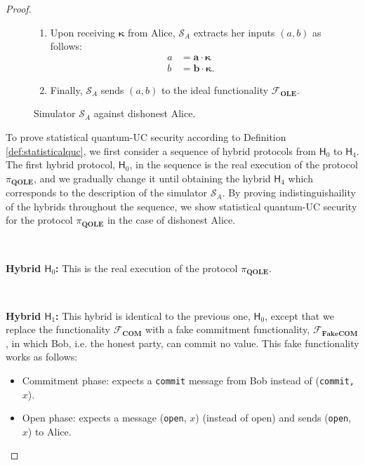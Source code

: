 \begin{proof}
\begin{figure}[h!]
\begin{tcolorbox}
\begin{enumerate}
 
        
        \item Upon receiving $\bm{\kappa}$ from Alice, $\mathcal{S}_A$ extracts her inputs $(a,b)$ as follows:
        \begin{equation}
            \begin{split}
            a &= \bm{a} \cdot \bm{\kappa} \\
            b &= \bm{b} \cdot \bm{\kappa}.
            \end{split}
        \label{eqn:extract_2}
        \end{equation}
        
        
        \item Finally, $\mathcal{S}_A$ sends $(a,b)$ to the ideal functionality $\mathcal{F}_{\textbf{OLE}}$.
        
    \end{enumerate} 
        
        \end{tcolorbox}
\caption{Simulator $\mathcal{S}_A$ against  dishonest Alice.}
\label{fig:simulator_dis_Alice}
\end{figure}
To prove statistical quantum-UC security according to Definition \ref{def:statisticalquc}, we first consider a sequence of hybrid protocols from $\mathsf{H}_0$ to $\mathsf{H}_4$. The first hybrid protocol, $\mathsf{H}_0$, in the sequence  is the real execution of the protocol $\mathcal{\pi}_{\textbf{QOLE}}$, and we gradually change it until obtaining the hybrid $\mathsf{H}_4$ which corresponds to the description of the simulator $\mathcal{S}_A$. By proving indistinguishaility of the hybrids throughout the sequence, we show statistical quantum-UC security for the protocol $\mathcal{\pi}_{\textbf{QOLE}}$ in the case of dishonest Alice.


\

\textbf{Hybrid $\mathsf{H}_0$:} This is the real execution of the protocol $\mathcal{\pi}_{\textbf{QOLE}}$.

\

\textbf{Hybrid $\mathsf{H}_1$:} This hybrid is identical to the previous one, $\mathsf{H}_0$, except that we replace the functionality $\mathcal{F}_{\textbf{COM}}$ with a fake commitment functionality, $\mathcal{F}_{\textbf{FakeCOM}}$, in which Bob, i.e. the honest party, can commit no value. This fake functionality works as follows: 

\begin{itemize}
    \item Commitment phase: expects a \texttt{commit} message from Bob instead of (\texttt{commit, $x$}).
    \item Open phase: expects a message (\texttt{open}, $x$) (instead of open) and sends (\texttt{open}, $x$) to Alice.
\end{itemize}


\end{proof}
